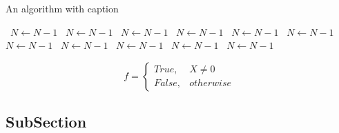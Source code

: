 \documentclass[a4paper]{article}
\begin{document}
\begin{algorithm}
\caption{An algorithm with caption}
\begin{algorithmic}
\    \State $N \gets N - 1$
\    \State $N \gets N - 1$
\    \State $N \gets N - 1$
\    \State $N \gets N - 1$
\    \State $N \gets N - 1$
\    \State $N \gets N - 1$
\    \State $N \gets N - 1$
\    \State $N \gets N - 1$
\    \State $N \gets N - 1$
\    \State $N \gets N - 1$
\    \State $N \gets N - 1$
\EndWhile
\end{algorithmic}
\end{algorithm}

\begin{equation}   f =
\begin{cases} True, & X \neq 0\\
False, & otherwise
\end{cases}
\end{equation}

\subsection{SubSection}
\end{document}
